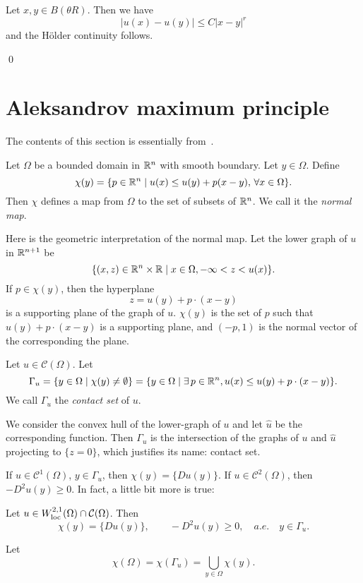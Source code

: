 Let $x,y\in  B(\theta R)$. Then we have
\[
|u(x)-u(y)|\leq 
C|x-y|^r
\]
and the H\"older continuity follows.

\qed


\section{Aleksandrov maximum principle}\label{ABP_principle}
The contents of this section is essentially from~\cite{chen}.
\begin{definition}\label{def8} Let $\Omega$ be a bounded domain in $\mathbb R^n$ with smooth boundary. Let $y\in\Omega$. Define
\[
\chi(y)=\{p\in\mathbb R^n\mid u(x)\leq u(y)+p(x-y),\,\forall x\in \Omega\}.
\]
Then $\chi$ defines a map from $\Omega$ to the set of subsets of $\mathbb R^n$. We call it the \emph{normal map}.
\end{definition}

Here is the geometric interpretation of the normal map. Let the lower graph of $u$ in $\mathbb R^{n+1}$ be
\[
\{(x,z)\in\mathbb R^n\times \mathbb R\mid x\in\Omega, -\infty<z<u(x)\}. 
\]
If $p\in\chi(y)$, then the hyperplane
\[
z=u(y)+p\cdot(x-y)
\]
is a supporting plane of the graph of $u$. $\chi(y)$ is the set of $p$ such that $u(y)+p\cdot(x-y)$ is a supporting plane, and $(-p,1)$ is the normal vector of the corresponding the plane.

\begin{definition}\label{def9} Let $u\in \mathcal C(\Omega)$. Let 
\[
\Gamma_u=\{y\in\Omega\mid \chi(y)\neq\emptyset\}=\{y\in\Omega\mid \exists \,p\in\mathbb R^n, u(x)\leq u(y)+p\cdot(x-y)\}.
\]
We call $\Gamma_u$ the \emph{contact set} of $u$.
\end{definition}

We consider the convex hull of the lower-graph of $u$ and let $\hat u$ be the corresponding function.
Then $\Gamma_u$ is the intersection  of the graphs of $u$ and $\hat u$ projecting to $\{z=0\}$, which justifies its name: contact set.

If $u\in \mathcal C^1(\Omega)$, $y\in\Gamma_u$, then $\chi(y)=\{Du(y)\}$. If $u\in \mathcal C^2(\Omega)$, then $-D^2u(y)\geq 0$. In fact, a little bit more is true:

\begin{lemma} Let $u\in W_{{\rm loc}}^{2,1}(\Omega)\cap \mathcal C(\Omega)$. Then
\[
\chi(y)=\{Du(y)\},\qquad -D^2u(y)\geq 0,\quad a.e.\quad y\in\Gamma_u.
\]
\end{lemma}

\begin{definition} Let
\[
\chi(\Omega)=\chi(\Gamma_u)=\bigcup_{y\in\Omega}\chi(y).
\]
\end{definition}

